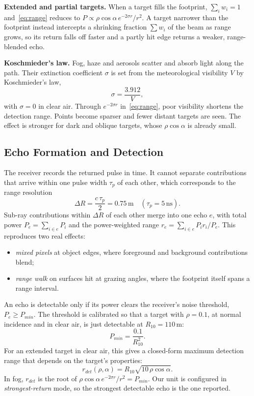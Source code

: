 \documentclass[11pt]{article}
\begin{document}
\textbf{Extended and partial targets.} When a target fills the footprint, $\sum_i w_i = 1$ and~\eqref{eq:range} reduces to $P \propto \rho\cos\alpha\, e^{-2\sigma r}/r^2$.
A target narrower than the footprint instead intercepts a shrinking fraction $\sum w_i$ of the beam as range grows, so its return falls off faster
and a partly hit edge returns a weaker, range-blended echo.

\textbf{Koschmieder's law.} Fog, haze and aerosols scatter and absorb light along the path. Their extinction coefficient $\sigma$ is set from the
meteorological visibility $V$ by Koschmieder's law,
\begin{equation}
    \sigma = \frac{3.912}{V},
\end{equation}
with $\sigma = 0$ in clear air. Through $e^{-2\sigma r}$ in~\eqref{eq:range}, poor visibility shortens the detection range. Points become sparser and
fewer distant targets are seen. The effect is stronger for dark and oblique targets, whose $\rho\cos\alpha$ is already small.

\subsection{Echo Formation and Detection}\label{sec:detect}
The receiver records the returned pulse in time. It cannot separate contributions that arrive within one pulse width $\tau_p$ of each other,
which corresponds to the range resolution
\begin{equation}
    \Delta R = \frac{c\,\tau_p}{2} = 0.75\,\text{m} \quad (\tau_p = 5\,\text{ns}).
\end{equation}
Sub-ray contributions within $\Delta R$ of each other merge into one echo $e$, with total power $P_e = \sum_{i\in e} P_i$ and the power-weighted range
$r_e = \sum_{i\in e} P_i r_i / P_e$. This reproduces two real effects:
\begin{itemize}
    \item \emph{mixed pixels} at object edges, where foreground and background contributions blend;
    \item \emph{range walk} on surfaces hit at grazing angles, where the footprint itself spans a range interval.
\end{itemize}
An echo is detectable only if its power clears the receiver's noise threshold, $P_e \ge P_{min}$. The threshold is calibrated so that a target with
$\rho = 0.1$, at normal incidence and in clear air, is just detectable at $R_{10} = 110$\,m:
\begin{equation}
    P_{min} = \frac{0.1}{R_{10}^2}.
\end{equation}
For an extended target in clear air, this gives a closed-form maximum detection range that depends on the target's properties:
\begin{equation}\label{eq:rdet}
    r_{det}(\rho, \alpha) = R_{10}\sqrt{10\,\rho\cos\alpha}.
\end{equation}
In fog, $r_{det}$ is the root of $\rho\cos\alpha\, e^{-2\sigma r}/r^2 = P_{min}$. Our unit is configured in \emph{strongest-return} mode,
so the strongest detectable echo is the one reported.
\end{document}
